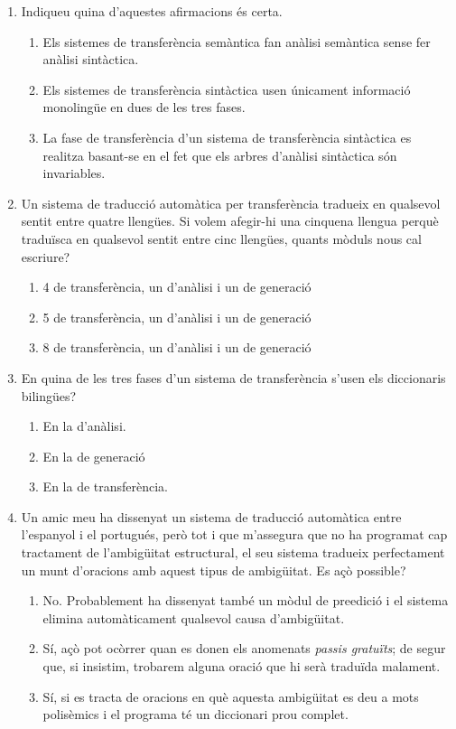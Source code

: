 \begin{enumerate}
\item Indiqueu quina d'aquestes afirmacions és certa.
  \begin{enumerate}
  \item Els sistemes de transferència semàntica fan anàlisi semàntica
    sense fer anàlisi sintàctica.
  \item Els sistemes de transferència sintàctica usen únicament
    informació monolingüe en dues de les tres fases.
  \item La fase de transferència d'un sistema de transferència
    sintàctica es realitza basant-se en el fet que els arbres
    d'anàlisi sintàctica són invariables.
  \end{enumerate}

\item Un sistema de traducció automàtica per transferència tradueix en
  qualsevol sentit entre quatre llengües. Si volem afegir-hi una
  cinquena llengua perquè traduïsca en qualsevol sentit entre cinc
  llengües, quants mòduls nous cal escriure?
  \begin{enumerate}
  \item 4 de transferència, un d'anàlisi i un de generació
  \item 5 de transferència, un d'anàlisi i un de generació
  \item 8 de transferència, un d'anàlisi i un de generació
  \end{enumerate}

\item En quina de les tres fases d'un sistema de transferència s'usen
  els diccionaris bilingües?
  \begin{enumerate}
  \item En la d'anàlisi.
  \item En la de generació
  \item En la de transferència.
  \end{enumerate}

\item Un amic meu ha dissenyat un sistema de traducció automàtica
  entre l'espanyol i el portugués, però tot i que m'assegura que no ha
  programat cap tractament de l'ambigüitat estructural, el seu sistema
  tradueix perfectament un munt d'oracions amb aquest tipus de
  ambigüitat. Es açò possible?
  \begin{enumerate}
  \item No. Probablement ha dissenyat també un mòdul de preedició i el
    sistema elimina automàticament qualsevol causa d'ambigüitat.
  \item Sí, açò pot ocòrrer quan es donen els anomenats \emph{passis
      gratuïts}; de segur que, si insistim, trobarem alguna oració que
    hi serà traduïda malament.
  \item Sí, si es tracta de oracions en què aquesta ambigüitat es deu
    a mots polisèmics i el programa té un diccionari prou complet.
  \end{enumerate}


\end{enumerate}
